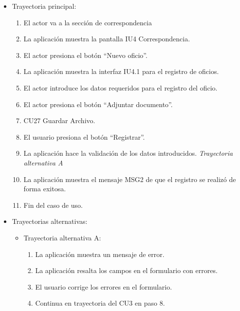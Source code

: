 \begin{itemize}
	\item Trayectoria principal:
	\begin{enumerate}
		\item El actor va a la sección de correspondencia 
		\item La aplicación muestra la pantalla IU4 Correspondencia.
		\item El actor presiona el botón “Nuevo oficio”.
		\item La aplicación muestra la interfaz IU4.1 para el registro de oficios.
		\item El actor introduce los datos requeridos para el registro del oficio.
		\item El actor presiona el botón “Adjuntar documento”.
		\item CU27 Guardar Archivo.
		\item El usuario presiona el botón “Registrar”. 
		\item La aplicación hace la validación de los datos introducidos. \textsl{Trayectoria alternativa A} 
		\item La aplicación muestra el mensaje MSG2 de que el registro se realizó de forma exitosa.
		\item Fin del caso de uso.
	\end{enumerate}
	
	\item Trayectorias alternativas:
	\begin{itemize}
		\item Trayectoria alternativa A:
			\begin{enumerate}
				\item La aplicación muestra un mensaje de error.
				\item La aplicación resalta los campos en el formulario con errores.
				\item El usuario corrige los errores en el formulario.
				\item Continua en trayectoria del CU3 en paso 8.
			\end{enumerate}
	\end{itemize}
\end{itemize}

